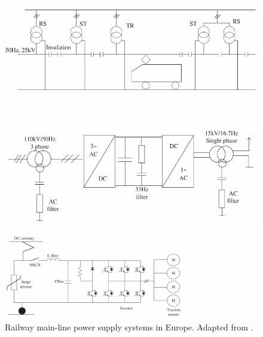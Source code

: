 \begin{figure}[h!]
	\centering
	\begin{minipage}{.45\textwidth}
		\centering
		\includegraphics[width=\textwidth,keepaspectratio]{figures/31.PowerS/abad2016d}
		\label{fig:abad2016d}
	\end{minipage}%
	\begin{minipage}{.03\textwidth}  ~\end{minipage}	
	\begin{minipage}{.375\textwidth}
		\centering
		\includegraphics[width=\textwidth,keepaspectratio]{figures/31.PowerS/abad2016e}
		\label{fig:abad2016e}
	\end{minipage}
\end{figure}












\begin{figure}[h!]
	\centering
	\includegraphics[width=0.7\textwidth,keepaspectratio]{figures/31.PowerS/abad2016c}
	\caption{Railway main-line power supply systems in Europe. Adapted from \cite{abad2016}.}
	\label{fig:abad2016c}
\end{figure}

